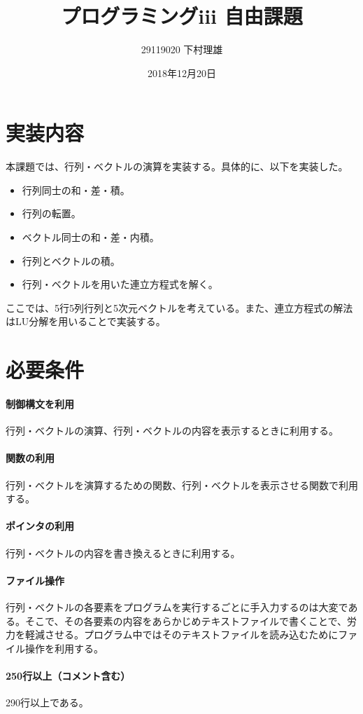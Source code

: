 \documentclass[12pt,a4j]{jarticle}
\title{プログラミングiii 自由課題}
\author{29119020 下村理雄}
\date{2018年12月20日}
\begin{document}
\maketitle

\section{実装内容}
本課題では、行列・ベクトルの演算を実装する。具体的に、以下を実装した。
\begin{itemize}
\item 行列同士の和・差・積。
\item 行列の転置。
\item ベクトル同士の和・差・内積。
\item 行列とベクトルの積。
\item 行列・ベクトルを用いた連立方程式を解く。
\end{itemize}
ここでは、5行5列行列と5次元ベクトルを考えている。また、連立方程式の解法はLU分解を用いることで実装する。

\section{必要条件}
\paragraph{制御構文を利用}
行列・ベクトルの演算、行列・ベクトルの内容を表示するときに利用する。
\paragraph{関数の利用}
行列・ベクトルを演算するための関数、行列・ベクトルを表示させる関数で利用する。
\paragraph{ポインタの利用}
行列・ベクトルの内容を書き換えるときに利用する。
\paragraph{ファイル操作}
行列・ベクトルの各要素をプログラムを実行するごとに手入力するのは大変である。そこで、その各要素の内容をあらかじめテキストファイルで書くことで、労力を軽減させる。プログラム中ではそのテキストファイルを読み込むためにファイル操作を利用する。
\paragraph{250行以上（コメント含む）}
290行以上である。
\end{document}

